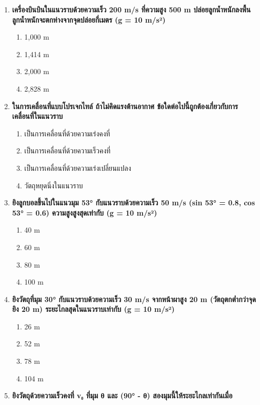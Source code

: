 \documentclass[12pt]{article}
\begin{document}
\begin{enumerate}
\begin{enumerate}[label=\alph*)]
\item 30°
\item 45°
\item 60°
\item 90°
\end{enumerate}
\item \textbf{เครื่องบินบินในแนวราบด้วยความเร็ว 200 m/s ที่ความสูง 500 m ปล่อยลูกน้ำหนักลงพื้น ลูกน้ำหนักจะตกห่างจากจุดปล่อยกี่เมตร (g = 10 m/s²)}
\begin{enumerate}[label=\alph*)]
\item 1,000 m
\item 1,414 m
\item 2,000 m
\item 2,828 m
\end{enumerate}
\item \textbf{ในการเคลื่อนที่แบบโปรเจกไทล์ ถ้าไม่คิดแรงต้านอากาศ ข้อใดต่อไปนี้ถูกต้องเกี่ยวกับการเคลื่อนที่ในแนวราบ}
\begin{enumerate}[label=\alph*)]
\item เป็นการเคลื่อนที่ด้วยความเร่งคงที่
\item เป็นการเคลื่อนที่ด้วยความเร็วคงที่
\item เป็นการเคลื่อนที่ด้วยความเร่งเปลี่ยนแปลง
\item วัตถุหยุดนิ่งในแนวราบ
\end{enumerate}
\item \textbf{ยิงลูกบอลขึ้นไปในแนวมุม 53° กับแนวราบด้วยความเร็ว 50 m/s (sin 53° = 0.8, cos 53° = 0.6) ความสูงสูงสุดเท่ากับ (g = 10 m/s²)}
\begin{enumerate}[label=\alph*)]
\item 40 m
\item 60 m
\item 80 m
\item 100 m
\end{enumerate}
\item \textbf{ยิงวัตถุที่มุม 30° กับแนวราบด้วยความเร็ว 30 m/s จากหน้าผาสูง 20 m (วัตถุตกต่ำกว่าจุดยิง 20 m) ระยะไกลสุดในแนวราบเท่ากับ (g = 10 m/s²)}
\begin{enumerate}[label=\alph*)]
\item 26 m
\item 52 m
\item 78 m
\item 104 m
\end{enumerate}
\item \textbf{ยิงวัตถุด้วยความเร็วคงที่ v₀ ที่มุม θ และ (90° - θ) สองมุมนี้ให้ระยะไกลเท่ากันเมื่อ}
\begin{enumerate}[label=\alph*)]

\end{enumerate}
\end{enumerate}
\end{document}
